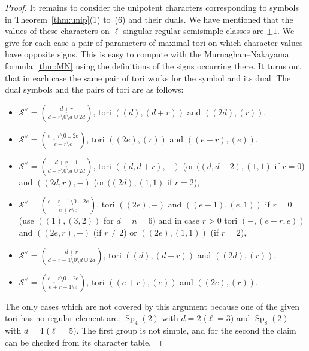 \documentclass{ert-l}
\newcommand{\cS}{{\mathcal{S}}}
\newcommand{\Sp}{{\operatorname{Sp}}}
\newcommand{\ul}[1]{\underline{#1}}
\let\sm=\setminus
\let\sys=\binom
\theoremstyle{definition}
\theoremstyle{remark}
\begin{document}
\begin{proof}
It remains to consider the unipotent characters corresponding to symbols
in Theorem~\ref{thm:unip}(1) to~(6) and their
duals. We have mentioned that the values of these characters on
$\ell$-singular regular semisimple classes are $\pm 1$. We give for each
case a pair of parameters of maximal tori on which character values have
opposite signs. This is easy to compute with the Murnaghan--Nakayama
formula~\ref{thm:MN} using the definitions of the signs occurring there.
It turns out that in each case the same pair of tori works for the symbol
and its dual. The dual symbols and the pairs of tori are as follows:
\begin{itemize}
\item[(1)] $\cS^\vee = \sys{\ul{d+r}}{\ul{d+r}\sm 0 \sm d \cup 2d}$, tori
$((d),(d+r))$ and $((2d),(r))$,
\item[(2)] $\cS^\vee = \sys{\ul{e+r}\sm 0 \cup 2e}{\ul{e+r}\sm e}$, tori
$((2e),(r))$ and $((e+r),(e))$,
\item[(3)] $\cS^\vee = \sys{\ul{d+r-1}}{\ul{d+r}\sm 0 \sm d \cup 2d}$, tori
$((d,d+r),-)$ (or $((d,d-2),(1,1)$ if $r=0$) and
$((2d,r),-)$ (or $((2d),(1,1)$ if $r=2$),
\item[(4)] $\cS^\vee = \sys{\ul{e+r-1} \sm 0 \cup 2e}{\ul{e+r}\sm e}$, tori
$((2e),-)$ and $((e-1),(e,1))$ if $r=0$ (use $((1),(3,2))$ for $d=n=6$)
and in case $r>0$  tori
$(-,(e+r,e))$ and $((2e,r),-)$ (if $r\neq 2$) or $((2e),(1,1))$ (if $r = 2$),
\item[(5)] $\cS^\vee = \sys{\ul{d+r}}{\ul{d+r-1}\sm 0 \sm d \cup 2d}$, tori
$((d),(d+r))$ and $((2d),(r))$,
\item[(6)] $\cS^\vee = \sys{\ul{e+r}\sm 0 \cup 2e}{\ul{e+r-1} \sm e}$, tori
$((e+r),(e))$ and $((2e),(r))$.
\end{itemize}
The only cases which are not covered by this argument because one of the
given tori has no regular element are: $\Sp_4(2)$ with $d=2$ ($\ell=3$) and
$\Sp_8(2)$ with $d=4$ ($\ell=5$). The first group is not simple, and for the
second the claim can be checked from its character
table.
\end{proof}
\end{document}
